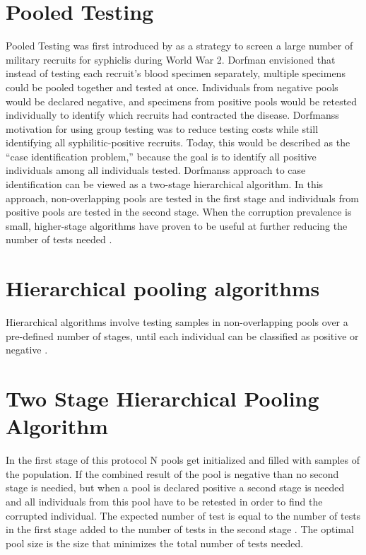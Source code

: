\section{Pooled Testing}
Pooled Testing was first introduced by \cite{dorfman1943detection} as a strategy to screen a large number of military recruits for syphiclis during World War 2. Dorfman envisioned that instead of testing each recruit's blood specimen separately, multiple specimens could be pooled together and tested at once. Individuals from negative pools would be declared negative, and specimens from positive pools would be retested individually to identify which recruits had contracted the disease. Dorfmanss motivation for using group testing was to reduce testing costs while still identifying all syphilitic-positive recruits. Today, this would be described as the “case identification problem,” because the goal is to identify all positive individuals among all individuals tested. Dorfmanss approach to case identification can be viewed as a two-stage hierarchical algorithm. In this approach, non-overlapping pools are tested in the first stage and individuals from positive pools are tested in the second stage. When the corruption prevalence is small, higher-stage algorithms have proven to be useful at further reducing the number of tests needed \cite[1]{hou2017hierarchical}.
\section{Hierarchical pooling algorithms}
Hierarchical algorithms involve testing samples in non-overlapping pools over a pre-defined number of stages, until each individual can be classified as positive or negative \cite[2]{lagopati2021sample}.
\section{Two Stage Hierarchical Pooling Algorithm} \label{two-stage-hierarchical}
In the first stage of this protocol N pools get initialized and filled with samples of the population. If the combined result of the pool is negative than no second stage is needied, but when a pool is declared positive a second stage is needed and all individuals from this pool have to be retested in order to find the corrupted individual. The expected number of test is equal to the number of tests in the first stage added to the number of tests in the second stage \cite[3]{nianogo2021optimal}. The optimal pool size is the size that minimizes the total number of tests needed.
